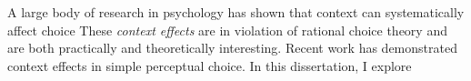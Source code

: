 A large body of research in psychology has shown that context can systematically affect choice These \textit{context effects} are in violation of rational choice theory and are both practically and theoretically interesting. Recent work has demonstrated context effects in simple perceptual choice. In this dissertation, I explore 